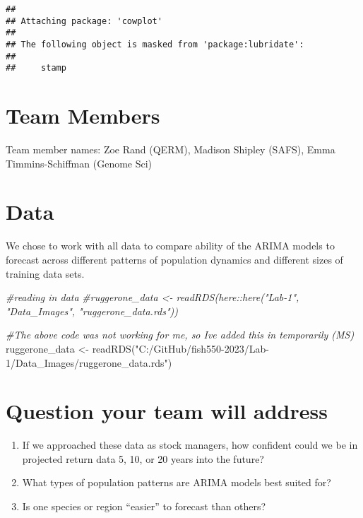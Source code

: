 \documentclass[
]{article}
\newenvironment{Shaded}{\begin{snugshade}}{\end{snugshade}}
\newcommand{\CommentTok}[1]{\textcolor[rgb]{0.56,0.35,0.01}{\textit{#1}}}
\newcommand{\FunctionTok}[1]{\textcolor[rgb]{0.00,0.00,0.00}{#1}}
\newcommand{\NormalTok}[1]{#1}
\newcommand{\OtherTok}[1]{\textcolor[rgb]{0.56,0.35,0.01}{#1}}
\newcommand{\StringTok}[1]{\textcolor[rgb]{0.31,0.60,0.02}{#1}}
\providecommand{\tightlist}{%
  \setlength{\itemsep}{0pt}\setlength{\parskip}{0pt}}
\begin{document}
\begin{verbatim}
## 
## Attaching package: 'cowplot'
## 
## The following object is masked from 'package:lubridate':
## 
##     stamp
\end{verbatim}

\hypertarget{team-members}{%
\section{Team Members}\label{team-members}}

Team member names: Zoe Rand (QERM), Madison Shipley (SAFS), Emma
Timmins-Schiffman (Genome Sci)

\hypertarget{data}{%
\section{Data}\label{data}}

We chose to work with all data to compare ability of the ARIMA models to
forecast across different patterns of population dynamics and different
sizes of training data sets.

\begin{Shaded}
\begin{Highlighting}[]
\CommentTok{\#reading in data}
\CommentTok{\#ruggerone\_data \textless{}{-} readRDS(here::here("Lab{-}1", "Data\_Images", "ruggerone\_data.rds"))}

\CommentTok{\#The above code was not working for me, so I\textquotesingle{}ve added this in temporarily (MS)}
\NormalTok{ruggerone\_data }\OtherTok{\textless{}{-}} \FunctionTok{readRDS}\NormalTok{(}\StringTok{"C:/GitHub/fish550{-}2023/Lab{-}1/Data\_Images/ruggerone\_data.rds"}\NormalTok{)}
\end{Highlighting}
\end{Shaded}

\hypertarget{question-your-team-will-address}{%
\section{Question your team will
address}\label{question-your-team-will-address}}

\begin{enumerate}
\def\labelenumi{\arabic{enumi}.}
\tightlist
\item
  If we approached these data as stock managers, how confident could we
  be in projected return data 5, 10, or 20 years into the future?
\item
  What types of population patterns are ARIMA models best suited for?
\item
  Is one species or region ``easier'' to forecast than others?
\end{enumerate}
\end{document}
